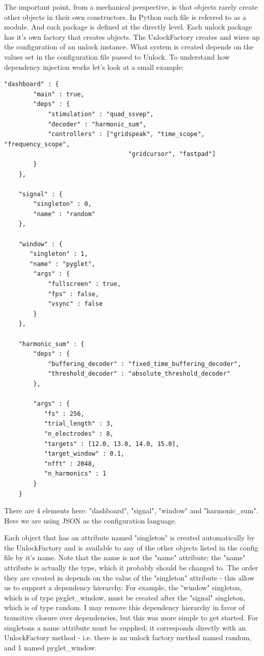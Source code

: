 \documentclass[11pt]{article}
\begin{document}
The important point, from a mechanical perspective, is that objects rarely create other objects in their own constructors.  In Python each file is referred to as a module.  And each package is defined at the directly level.  Each unlock package has it's own factory that creates objects.  The UnlockFactory creates and wires up the configuration of an unlock instance.  What system is created depends on the values set in the configuration file passed to Unlock.  To understand how dependency injection works let's look at a small example:
\begin{verbatim}
"dashboard" : {
        "main" : true,
        "deps" : {
            "stimulation" : "quad_ssvep",
            "decoder" : "harmonic_sum",
            "controllers" : ["gridspeak", "time_scope", "frequency_scope",
                                  "gridcursor", "fastpad"]
        }
    },
    
    "signal" : {
        "singleton" : 0,
        "name" : "random"
    },

    "window" : {
       "singleton" : 1,
       "name" : "pyglet",
        "args" : {
            "fullscreen" : true,
            "fps" : false,
            "vsync" : false
        }
    },
   
    "harmonic_sum" : {
        "deps" : {
            "buffering_decoder" : "fixed_time_buffering_decoder",
            "threshold_decoder" : "absolute_threshold_decoder"
        },
        
        "args" : {
           "fs" : 256,
           "trial_length" : 3,
           "n_electrodes" : 8,
           "targets" : [12.0, 13.0, 14.0, 15.0],
           "target_window" : 0.1,
           "nfft" : 2048,
           "n_harmonics" : 1
        }
    }
\end{verbatim}

There are 4 elements here: "dashboard",  "signal", "window" and "harmonic\_sum".  Here we are using JSON as the configuration language. 

Each object that has an attribute named "singleton" is created automatically by the UnlockFactory and is available to any of the other objects listed in the config file by it's name.  Note that the name is not the "name" attribute; the "name" attribute is actually the type, which it probably should be changed to.  The order they are created in depends on the value of the "singleton" attribute - this allow us to support a dependency hierarchy.  For example, the "window" singleton, which is of type pyglet\_window, must be created after the "signal" singleton, which is of type random.  I may remove this dependency hierarchy in favor of transitive closure over dependencies, but this was more simple to get started.  For singletons a name attribute must be supplied; it corresponds directly with an UnlockFactory method - i.e. there is an unlock factory method named random, and 1 named pyglet\_window.
\end{document}
